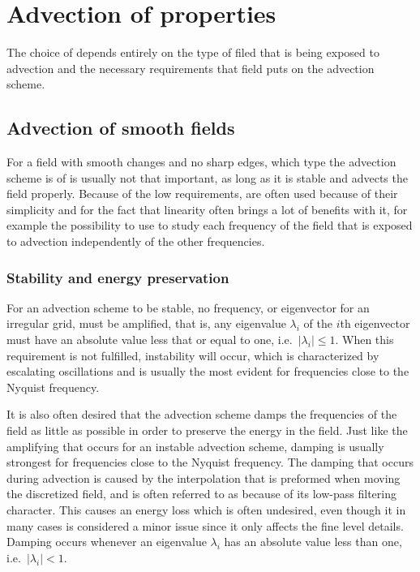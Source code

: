\chapter{Advection of properties}

The choice of  depends entirely on the type of filed that is being exposed to advection and the necessary requirements that field puts on the advection scheme.

\section{Advection of smooth fields}

For a field with smooth changes and no sharp edges, which type the advection scheme is of is usually not that important, as long as it is stable and advects the field properly. Because of the low requirements,  are often used because of their simplicity and for the fact that linearity often brings a lot of benefits with it, for example the possibility to use  to study each frequency of the field that is exposed to advection independently of the other frequencies.

\subsection{Stability and energy preservation}

For an advection scheme to be stable, no frequency, or eigenvector for an irregular grid, must be amplified, that is, any eigenvalue $\lambda_i$ of the $i$th eigenvector must have an absolute value less that or equal to one, i.e.\ $|\lambda_i| \leq 1$. When this requirement is not fulfilled, instability will occur, which is characterized by escalating oscillations and is usually the most evident for frequencies close to the Nyquist frequency.


It is also often desired that the advection scheme damps the frequencies of the field as little as possible in order to preserve the energy in the field. Just like the amplifying that occurs for an instable advection scheme, damping is usually strongest for frequencies close to the Nyquist frequency. The damping that occurs during advection is caused by the interpolation that is preformed when moving the discretized field, and is often referred to as \smearing because of its low-pass filtering character. This causes an energy loss which is often undesired, even though it in many cases is considered a minor issue since it only affects the fine level details. Damping occurs whenever an eigenvalue $\lambda_i$ has an absolute value less than one, i.e.\ $|\lambda_i| < 1$.

